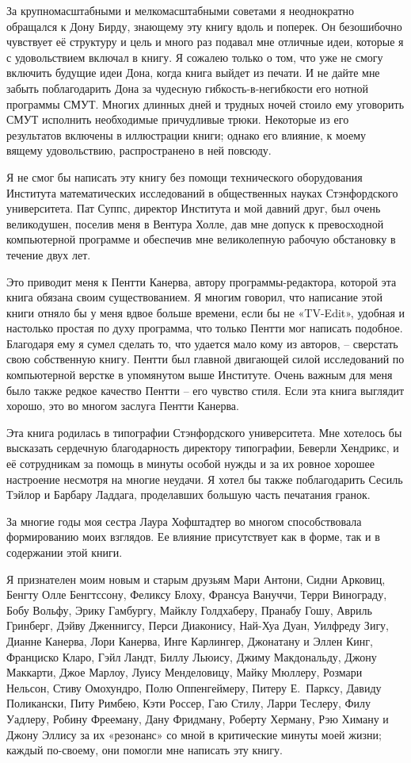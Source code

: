 \documentclass[../main.tex]{subfiles}
\begin{document}
За крупномасштабными и мелкомасштабными советами я неоднократно обращался к Дону Бирду, знающему эту книгу вдоль и поперек. Он безошибочно чувствует её структуру и цель и много раз подавал мне отличные идеи, которые я с удовольствием включал в книгу. Я сожалею только о том, что уже не смогу включить будущие идеи Дона, когда книга выйдет из печати. И не дайте мне забыть поблагодарить Дона за чудесную гибкость-в-негибкости его нотной программы СМУТ\@. Многих длинных дней и трудных ночей стоило ему уговорить СМУТ исполнить необходимые причудливые трюки. Некоторые из его результатов включены в иллюстрации книги; однако его влияние, к моему вящему удовольствию, распространено в ней повсюду.

Я не смог бы написать эту книгу без помощи технического оборудования Института математических исследований в общественных науках Стэнфордского университета. Пат Суппс, директор Института и мой давний друг, был очень великодушен, поселив меня в Вентура Холле, дав мне допуск к превосходной компьютерной программе и обеспечив мне великолепную рабочую обстановку в течение двух лет.

Это приводит меня к Пентти Канерва, автору программы-редактора, которой эта книга обязана своим существованием. Я многим говорил, что написание этой книги отняло бы у меня вдвое больше времени, если бы не «TV-Edit», удобная и настолько простая по духу программа, что только Пентти мог написать подобное. Благодаря ему я сумел сделать то, что удается мало кому из авторов, \--- сверстать свою собственную книгу. Пентти был главной двигающей силой исследований по компьютерной верстке в упомянутом выше Институте. Очень важным для меня было также редкое качество Пентти \--- его чувство стиля. Если эта книга выглядит хорошо, это во многом заслуга Пентти Канерва.

Эта книга родилась в типографии Стэнфордского университета. Мне хотелось бы высказать сердечную благодарность директору типографии, Беверли Хендрикс, и её сотрудникам за помощь в минуты особой нужды и за их ровное хорошее настроение несмотря на многие неудачи. Я хотел бы также поблагодарить Сесиль Тэйлор и Барбару Ладдага, проделавших большую часть печатания гранок.

За многие годы моя сестра Лаура Хофштадтер во многом способствовала формированию моих взглядов. Ее влияние присутствует как в форме, так и в содержании этой книги.

Я признателен моим новым и старым друзьям Мари Антони, Сидни Арковиц, Бенгту Олле Бенгтссону, Феликсу Блоху, Франсуа Вануччи, Терри Винограду, Бобу Вольфу, Эрику Гамбургу, Майклу Голдхаберу, Пранабу Гошу, Авриль Гринберг, Дэйву Дженнигсу, Перси Диаконису, Най-Хуа Дуан, Уилфреду Зигу, Дианне Канерва, Лори Канерва, Инге Карлингер, Джонатану и Эллен Кинг, Франциско Кларо, Гэйл Ландт, Биллу Льюису, Джиму Макдональду, Джону Маккарти, Джое Марлоу, Луису Менделовицу, Майку Мюллеру, Розмари Нельсон, Стиву Омохундро, Полю Оппенгеймеру, Питеру Е.~Парксу, Давиду Поликански, Питу Римбею, Кэти Россер, Гаю Стилу, Ларри Теслеру, Филу Уадлеру, Робину Фрееману, Дану Фридману, Роберту Херману, Рэю Химану и Джону Эллису за их «резонанс» со мной в критические минуты моей жизни; каждый по-своему, они помогли мне написать эту книгу.
\end{document}
